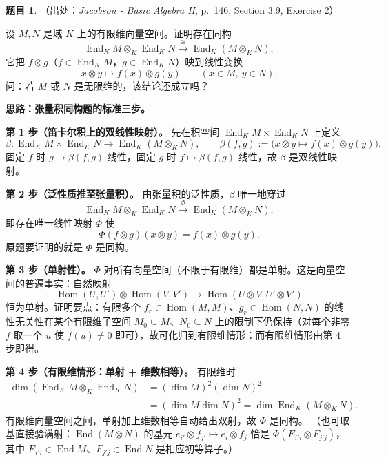 \documentclass[a4paper]{ctexart}
\theoremstyle{definition}
\newtheorem{example}{题目}[section]
\theoremstyle{analysis}
\theoremstyle{plain}
\begin{document}
\begin{example}
（出处：\textit{Jacobson - Basic Algebra II}, p.~146, Section 3.9, Exercise 2）

设 \(M,N\) 是域 \(K\) 上的有限维向量空间。证明存在同构
\[
  \operatorname{End}_K M\otimes_K \operatorname{End}_K N
  \xrightarrow{\ \cong\ }
  \operatorname{End}_K(M\otimes_K N),
\]
它把 \(f\otimes g\)（\(f\in\operatorname{End}_K M\)，\(g\in\operatorname{End}_K N\)）映到线性变换
\[
  x\otimes y\longmapsto f(x)\otimes g(y)
  \qquad (x\in M,\ y\in N).
\]
问：若 \(M\) 或 \(N\) 是无限维的，该结论还成立吗？

\textbf{思路：张量积同构题的标准三步。}

\textbf{第 1 步（笛卡尔积上的双线性映射）。}
先在积空间 \(\operatorname{End}_K M\times\operatorname{End}_K N\) 上定义
\[
  \beta:\operatorname{End}_K M\times\operatorname{End}_K N
  \longrightarrow \operatorname{End}_K(M\otimes_K N),
  \qquad
  \beta(f,g):=\bigl(x\otimes y\mapsto f(x)\otimes g(y)\bigr).
\]
固定 \(f\) 时 \(g\mapsto\beta(f,g)\) 线性，固定 \(g\) 时 \(f\mapsto\beta(f,g)\) 线性，故 \(\beta\) 是双线性映射。

\textbf{第 2 步（泛性质推至张量积）。}
由张量积的泛性质，\(\beta\) 唯一地穿过
\[
  \operatorname{End}_K M\otimes_K\operatorname{End}_K N
  \xrightarrow{\ \Phi\ }
  \operatorname{End}_K(M\otimes_K N),
\]
即存在唯一线性映射 \(\Phi\) 使
\[
  \Phi(f\otimes g)(x\otimes y)=f(x)\otimes g(y).
\]
原题要证明的就是 \(\Phi\) 是同构。

\textbf{第 3 步（单射性）。}
\(\Phi\) 对所有向量空间（不限于有限维）都是单射。这是向量空间的普遍事实：自然映射
\[
  \operatorname{Hom}(U,U')\otimes\operatorname{Hom}(V,V')
  \longrightarrow \operatorname{Hom}(U\otimes V,U'\otimes V')
\]
恒为单射。证明要点：有限多个 \(f_r\in\operatorname{Hom}(M,M)\)、\(g_r\in\operatorname{Hom}(N,N)\) 的线性无关性在某个有限维子空间 \(M_0\subseteq M\)、\(N_0\subseteq N\) 上的限制下仍保持（对每个非零 \(f\) 取一个 \(u\) 使 \(f(u)\neq 0\) 即可），故可化归到有限维情形；而有限维情形由第 4 步即得。

\textbf{第 4 步（有限维情形：单射 + 维数相等）。}
有限维时
\[
\begin{aligned}
  \dim(\operatorname{End}_K M\otimes_K\operatorname{End}_K N)
  &=(\dim M)^2(\dim N)^2\\
  &=(\dim M\dim N)^2
  =\dim\operatorname{End}_K(M\otimes_K N).
\end{aligned}
\]
有限维向量空间之间，单射加上维数相等自动给出双射，故 \(\Phi\) 是同构。
（也可取基直接验满射：\(\operatorname{End}(M\otimes N)\) 的基元
\(e_{i'}\otimes f_{j'}\mapsto e_i\otimes f_j\) 恰是 \(\Phi(E_{i'i}\otimes F_{j'j})\)，
其中 \(E_{i'i}\in\operatorname{End}M\)、\(F_{j'j}\in\operatorname{End}N\) 是相应初等算子。）


\end{example}
\end{document}
